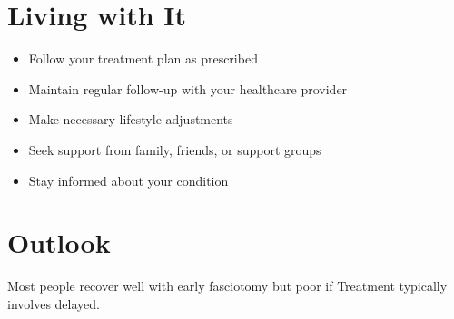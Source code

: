\section{Living with It}
\begin{itemize}[noitemsep]
  \item Follow your treatment plan as prescribed
  \item Maintain regular follow-up with your healthcare provider
  \item Make necessary lifestyle adjustments
  \item Seek support from family, friends, or support groups
  \item Stay informed about your condition
\end{itemize}
\section{Outlook}
Most people recover well with early fasciotomy but poor if Treatment typically involves delayed.

